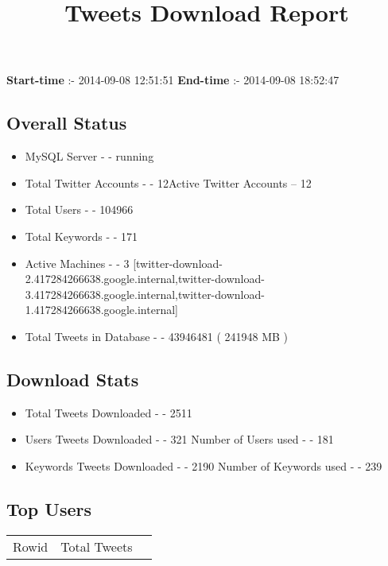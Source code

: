 \documentclass{article}\usepackage[T1]{fontenc}
\begin{document}
\title{\textbf{Tweets Download Report}}
               \date{}
                \maketitle
               \centerline{\textbf{Start-time} :- 2014-09-08 12:51:51 \hspace{40pt} \textbf{End-time} :- 2014-09-08 18:52:47}               \subsection*{Overall Status}                \begin{itemize}                \item MySQL Server - - running               \item Total Twitter Accounts - - 12\newline Active Twitter Accounts -- 12               \item Total Users - - 104966               \item Total Keywords - - 171               \item Active Machines - - 3 [twitter-download-2.417284266638.google.internal,twitter-download-3.417284266638.google.internal,twitter-download-1.417284266638.google.internal]               \item Total Tweets in Database - - 43946481 ( 241948 MB )               \end{itemize}               \subsection*{Download Stats}                \begin{itemize}                \item Total Tweets Downloaded - - 2511               \item Users Tweets Downloaded - - 321 \newline Number of Users used - - 181               \item Keywords Tweets Downloaded - - 2190 \newline Number of Keywords used - - 239              \end{itemize}              \subsection*{Top Users}\begin{tabular}{|c|c|c|}         \hline         Rowid & Total Tweets \\ 

\end{tabular}
\end{document}
